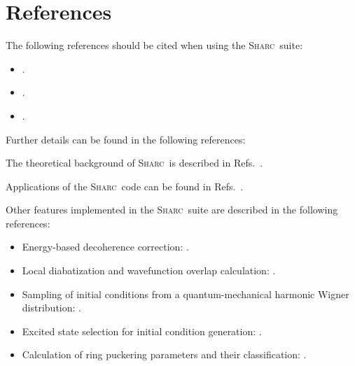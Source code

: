 \documentclass[a4paper,11pt,DIV=15,openany,twoside=false]{scrbook}
\newcommand{\sharc}{\textsc{Sharc}}
\begin{document}

\section{References}

The following references should be cited when using the \sharc\ suite:
{
\newcommand{\enquote}[1]{``#1''}
\begin{shaded}
  \begin{itemize}
    \item \cite{Richter2011JCTC} .
    \item \cite{Mai2015IJQC} .
    \item \cite{Mai2014SHARC} .
  \end{itemize}
\end{shaded}
}

Further details can be found in the following references:

The theoretical background of \sharc\ is described in Refs.~\cite{Richter2011JCTC, Richter2012JCTC_erratum, Bajo2011JPCA, Marquetand2011FD, Mai2015IJQC}.

Applications of the \sharc\ code can be found in Refs.~\cite{Richter2012JPCL, Mai2013C, Mai2014TCC, Mai2014JCP_SO2, Gonzalez2014}.

Other features implemented in the \sharc\ suite are described in the following references:
\begin{itemize}
  \item Energy-based decoherence correction: \cite{Granucci2007JCP}.
  \item Local diabatization and wavefunction overlap calculation: \cite{Granucci2001JCP, Pittner2009CP, Plasser2012JCP}.
  \item Sampling of initial conditions from a quantum-mechanical harmonic Wigner distribution: \cite{Dahl1988JCP, Schinke1995}.
  \item Excited state selection for initial condition generation: \cite{Barbatti2011}.
  \item Calculation of ring puckering parameters and their classification: \cite{Cremer1975JACS, Boeyens1976JCMS}.
\end{itemize}
\end{document}
